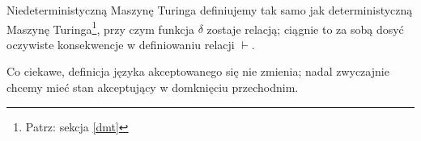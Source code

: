 \begin{definition}
	Niedeterministyczną Maszynę Turinga definiujemy tak samo jak deterministyczną Maszynę Turinga\footnote{Patrz: sekcja \ref{dmt}}, przy czym funkcja \( \delta \) zostaje relacją; ciągnie to za sobą dosyć oczywiste konsekwencje w definiowaniu relacji \( \vdash\).

	Co ciekawe, definicja języka akceptowanego się nie zmienia; nadal zwyczajnie chcemy mieć stan akceptujący w domknięciu przechodnim.
\end{definition}